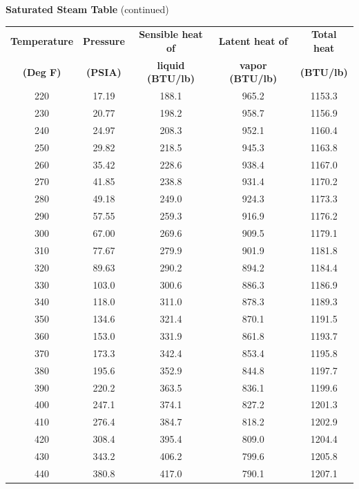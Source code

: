 \filbreak

\vskip 10pt

\centerline{\textbf{Saturated Steam Table} (continued)}


\begin{center}
\begin{tabular}{| c | c | c | c | c |}
\hline 
\textbf{Temperature} & \textbf{Pressure} & \textbf{Sensible heat of} & \textbf{Latent heat of} & \textbf{Total heat} \\[3pt]
\textbf{(Deg F)} & \textbf{(PSIA)} & \textbf{liquid (BTU/lb)} & \textbf{vapor (BTU/lb)} & \textbf{(BTU/lb)} \\[3pt] \hline
220 & 17.19 & 188.1 & 965.2 & 1153.3 \\[3pt] \hline
230 & 20.77 & 198.2 & 958.7 & 1156.9 \\[3pt] \hline
240 & 24.97 & 208.3 & 952.1 & 1160.4 \\[3pt] \hline
250 & 29.82 & 218.5 & 945.3 & 1163.8 \\[3pt] \hline
260 & 35.42 & 228.6 & 938.4 & 1167.0 \\[3pt] \hline
270 & 41.85 & 238.8 & 931.4 & 1170.2 \\[3pt] \hline
280 & 49.18 & 249.0 & 924.3 & 1173.3 \\[3pt] \hline
290 & 57.55 & 259.3 & 916.9 & 1176.2 \\[3pt] \hline
300 & 67.00 & 269.6 & 909.5 & 1179.1 \\[3pt] \hline
310 & 77.67 & 279.9 & 901.9 & 1181.8 \\[3pt] \hline
320 & 89.63 & 290.2 & 894.2 & 1184.4 \\[3pt] \hline
330 & 103.0 & 300.6 & 886.3 & 1186.9 \\[3pt] \hline
340 & 118.0 & 311.0 & 878.3 & 1189.3 \\[3pt] \hline
350 & 134.6 & 321.4 & 870.1 & 1191.5 \\[3pt] \hline
360 & 153.0 & 331.9 & 861.8 & 1193.7 \\[3pt] \hline
370 & 173.3 & 342.4 & 853.4 & 1195.8 \\[3pt] \hline
380 & 195.6 & 352.9 & 844.8 & 1197.7 \\[3pt] \hline
390 & 220.2 & 363.5 & 836.1 & 1199.6 \\[3pt] \hline
400 & 247.1 & 374.1 & 827.2 & 1201.3 \\[3pt] \hline
410 & 276.4 & 384.7 & 818.2 & 1202.9 \\[3pt] \hline
420 & 308.4 & 395.4 & 809.0 & 1204.4 \\[3pt] \hline
430 & 343.2 & 406.2 & 799.6 & 1205.8 \\[3pt] \hline
440 & 380.8 & 417.0 & 790.1 & 1207.1 \\[3pt] \hline
\end{tabular}
\end{center}







